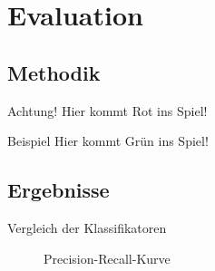 \documentclass{beamer}
\begin{document}
\section{Evaluation}
\subsection{Methodik}
\begin{frame}
  \begin{alertblock}{Achtung!}
    Hier kommt Rot ins Spiel!
  \end{alertblock}
  \begin{exampleblock}{Beispiel}
    Hier kommt Grün ins Spiel!
  \end{exampleblock}
\end{frame}

\subsection{Ergebnisse}
\begin{frame}
  \begin{table}
  \centering
  \caption{Vergleich der Klassifikatoren}
  \label{tab:prec-recall}
  \end{table}
\end{frame}

\begin{frame}[plain]
\begin{figure}
\caption{Precision-Recall-Kurve}
\label{fig:prec-recall}
\end{figure}
\end{frame}
\end{document}
